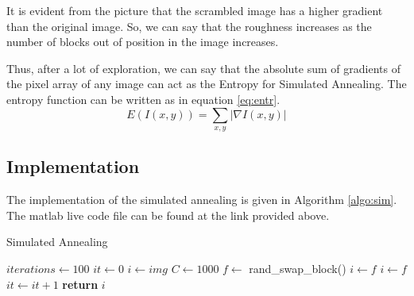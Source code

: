 \documentclass[journal, compsoc]{IEEEtran}
\begin{document}
It is evident from the picture that the scrambled image has a higher gradient than the original image.
So, we can say that the roughness increases as the number of blocks out of position in the image increases.

Thus, after a lot of exploration, we can say that the absolute sum of gradients of the pixel array of any image can act
as the Entropy for Simulated Annealing. The entropy function can be written as in equation \ref{eq:entr}.
\begin{equation}
E(I(x,y)) = \sum_{x,y} |\nabla I(x,y)|
\label{eq:entr}
\end{equation}

\subsection{Implementation}

The implementation of the simulated annealing is given in Algorithm \ref{algo:sim}. The matlab live code file can be found at the link
provided above.

\begin{algorithm}
\caption{Simulated Annealing}\label{algo:sim}
\begin{algorithmic}[1]
\State $iterations \gets 100$
\State $it \gets 0$
\State $i \gets img$ 
\State $C \gets 1000$
\State $f \gets $ rand\_swap\_block() 
\State $i \gets f$
\State $i \gets f$
\EndIf
\State $it \gets it + 1$
\EndWhile
\State \textbf{return } $i$
\EndProcedure
\end{algorithmic}
\end{algorithm}
\end{document}
